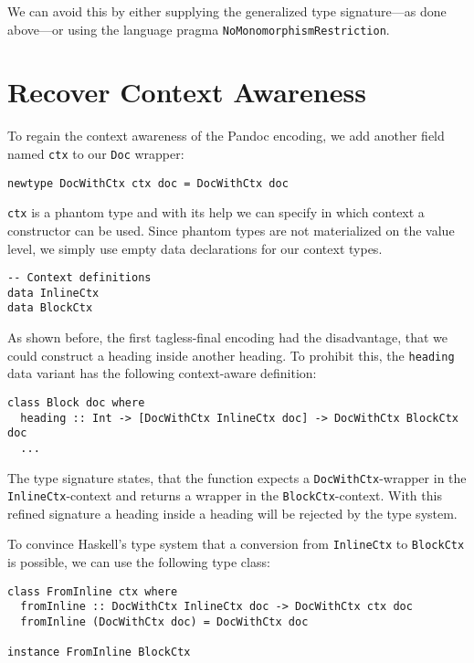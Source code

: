 We can avoid this by either supplying the generalized type signature—as done
above—or using the language pragma \texttt{NoMonomorphismRestriction}.

\section{Recover Context Awareness}

To regain the context awareness of the Pandoc encoding, we add another field
named \texttt{ctx} to our \texttt{Doc} wrapper:

\begin{lstlisting}
newtype DocWithCtx ctx doc = DocWithCtx doc
\end{lstlisting}

\texttt{ctx} is a phantom type and with its help we can specify in which context
a constructor can be used. Since phantom types are not materialized on the value
level, we simply use empty data declarations for our context types.

\begin{lstlisting}
-- Context definitions
data InlineCtx
data BlockCtx
\end{lstlisting}

As shown before, the first tagless-final encoding had the disadvantage, that we
could construct a heading inside another heading. To prohibit this, the
\texttt{heading} data variant has the following context-aware definition:

\begin{lstlisting}
class Block doc where
  heading :: Int -> [DocWithCtx InlineCtx doc] -> DocWithCtx BlockCtx doc
  ...
\end{lstlisting}

The type signature states, that the function expects a
\texttt{DocWithCtx}-wrapper in the \texttt{InlineCtx}-context and returns a
wrapper in the \texttt{BlockCtx}-context. With this refined signature a heading
inside a heading will be rejected by the type system.

To convince Haskell’s type system that a conversion from \texttt{InlineCtx} to
\texttt{BlockCtx} is possible, we can use the following type class:

\begin{lstlisting}
class FromInline ctx where
  fromInline :: DocWithCtx InlineCtx doc -> DocWithCtx ctx doc
  fromInline (DocWithCtx doc) = DocWithCtx doc

instance FromInline BlockCtx
\end{lstlisting}


